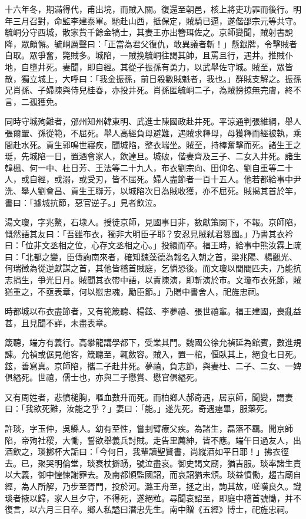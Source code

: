 \begin{pinyinscope}
十六年冬，期滿得代，甫出境，而賊入關。復還至朝邑，核上將吏功罪而後行。明年三月召對，命監李建泰軍。馳赴山西，抵保定，賊騎已逼，遂偕邵宗元等共守。毓峒分守西城，散家貲千餘金犒士，其妻王亦出簪珥佐之。京師變聞，賊射書說降，眾頗懈。毓峒厲聲曰：「正當為君父復仇，敢異議者斬！」懸銀牌，令擊賊者自取。眾爭奮，斃賊多。城陷，一賊挽毓峒往謁其帥，且罵且行，遇井。推賊仆地，自墮井死。妻聞，即自經。其從子振孫有勇力，以武舉佐守城。賊至，眾皆散，獨立城上，大呼曰：「我金振孫，前日殺數賊魁者，我也。」群賊支解之。振孫兄肖孫、子婦陳與侍兒桂春，亦投井死。肖孫匿毓峒二子，為賊搒掠無完膚，終不言，二孤獲免。

同時守城殉難者，邠州知州韓東明、武進士陳國政赴井死。平涼通判張維綱，舉人張爾翬、孫從範，不屈死。舉人高經負母避難，遇賊求釋母，母獲釋而經被執，乘間赴水死。貢生郭鳴世寢疾，聞城陷，整衣端坐。賊至，持棒奮擊而死。諸生王之珽，先城陷一日，置酒會家人，飲達旦。城破，偕妻齊及三子、二女入井死。諸生韓楓、何一中、杜日芳、王法等二十九人，布衣劉宗向、田仰名、劉自重等二十人，或自經，或溺，或受刃，皆不屈死。婦人盡節者一百十五人。他若都給事中尹洗、舉人劉會昌、貢生王聯芳，以城陷次日為賊收獲，亦不屈死。賊揭其首於竿，書曰：「據城抗節，惡官逆子。」見者飲泣。

湯文瓊，字兆鰲，石埭人。授徒京師，見國事日非，數獻策闕下，不報。京師陷，慨然語其友曰：「吾雖布衣，獨非大明臣子耶？安忍見賊弒君篡國。」乃書其衣衿曰：「位非文丞相之位，心存文丞相之心。」投繯而卒。福王時，給事中熊汝霖上疏曰：「北都之變，臣傳詢南來者，確知魏藻德為報名入朝之首，梁兆陽、楊觀光、何瑞徵為從逆獻謀之首，其他皆稽首賊庭，乞憐恐後。而文瓊以閭閻匹夫，乃能抗志捐生，爭光日月。賊聞其衣帶中語，以責陳演，即斬演於市。文瓊布衣死節，賊猶重之，不亟表章，何以慰忠魂，勵臣節。」乃贈中書舍人，祀旌忠祠。

時都城以布衣盡節者，又有範箴聽、楊鉉、李夢禧、張世禧輩。福王建國，喪亂益甚，且見聞不詳，未盡表章。

箴聽，端方有義行。高攀龍講學都下，受業其門。魏國公徐允禎延為館賓，數進規諫。允禎或倨見他客，箴聽至，輒斂容。賊入，置一棺，偃臥其上，絕食七日死。鉉，善寫真。京師陷，攜二子赴井死。夢禧，負志節，與妻杜、二子、二女、一婢俱縊死。世禧，儒士也，亦與二子懋賞、懋官俱縊死。

又有周姓者，悲憤槌胸，嘔血數升而死。而柏鄉人郝奇遇，居京師，聞變，謂妻曰：「我欲死難，汝能之乎？」妻曰：「能。」遂先死。奇遇瘞畢，服藥死。

許琰，字玉仲，吳縣人。幼有至性，嘗刲臂療父疾。為諸生，磊落不羈。聞京師陷，帝殉社稷，大慟，誓欲舉義兵討賊。走告里薦紳，皆不應。端午日過友人，出酒飲之，琰擲杯大詬曰：「今何日，我輩讀聖賢書，尚縱酒如平日耶！」拂衣徑去。已，聚哭明倫堂，琰衰杖擗踴，號泣盡哀。御史謁文廟，猶吉服。琰率諸生責以大義，御中惶悚謝罪去。及南都頒監國詔，而哀詔猶未頒。琰益憤慟，趨古廟自經，為人所解，乃步至胥門，投於河。潞王舟至，拯之出，詢其故，嗟嘆良久。識琰者掖以歸，家人旦夕守，不得死，遂絕粒。尋聞哀詔至，即庭中稽首號慟，并不復言，以六月三日卒。鄉人私謚曰潛忠先生。南中贈《五經》博士，祀旌忠祠。


\end{pinyinscope}
